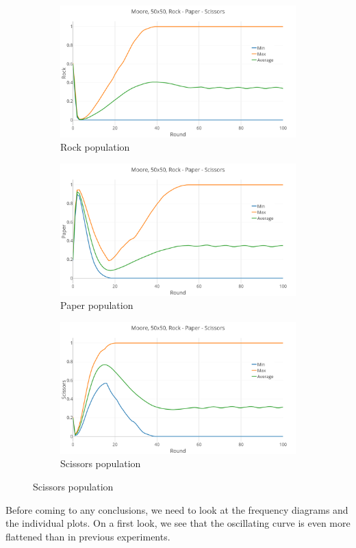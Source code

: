 \documentclass[a4paper, 11pt]{article}
\begin{document}
\begin{landscape}
\begin{figure}[H]
	\begin{subfigure}{0.53\textwidth}
		\includegraphics[width=1\linewidth]{50x50_60RockDist_Rock}
		\caption{Rock population}
	\end{subfigure}%
	\begin{subfigure}{0.53\textwidth}
		\includegraphics[width=1\linewidth]{50x50_60RockDist_Paper}
		\caption{Paper population}
	\end{subfigure}%
	\begin{subfigure}{0.53\textwidth}
		\includegraphics[width=1\linewidth]{50x50_60RockDist_Scissors}
		\caption{Scissors population}
	\end{subfigure}
\end{figure}

Before coming to any conclusions, we need to look at the frequency diagrams and the individual plots. On a first look, we see that the oscillating curve is even more flattened than in previous experiments.

\end{landscape}
\end{document}
